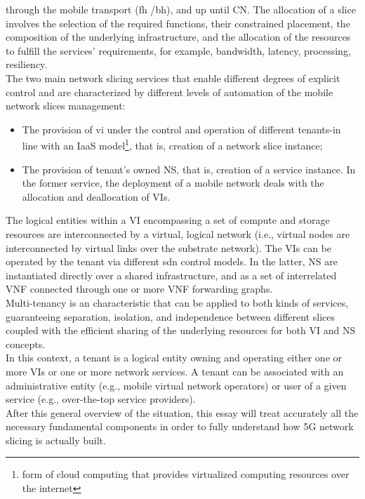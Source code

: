 \documentclass{report}
\begin{document}
through the mobile transport (\gls{fh} /\gls{bh}), and up until
\gls{CN}. The allocation of a slice involves the selection of the
required functions, their constrained placement, the composition of the underlying infrastructure, and the allocation of the resources to fulfill the services' requirements, for example, bandwidth, latency, processing, resiliency.\\
The two main network slicing services that enable different degrees
of explicit control and are characterized by different levels of automation of the
mobile network slices management:
\begin{itemize}
\item The provision of \gls{vi} under the control and operation
of different tenants-in line with an \gls{IaaS} model\footnote{form of cloud computing that provides virtualized computing resources over the internet},
that is, creation of a network slice instance;
\end{itemize}
\begin{itemize}
\item The provision of tenant's owned \gls{NS}, that is, creation of a service instance.
In the former service, the deployment of a mobile network deals with the
allocation and deallocation of VIs.
\end{itemize}
The logical entities within a VI encompassing
a set of compute and storage resources are interconnected by a virtual, logical
network (i.e., virtual nodes are interconnected by virtual links over the substrate
network). The VIs can be operated by the tenant via different \gls{sdn} control
models. In the latter, NS are instantiated directly over a shared infrastructure,
and as a set of interrelated \gls{VNF} connected through
one or more VNF forwarding graphs.\\
Multi-tenancy is an characteristic that can be applied to both
kinds of services, guaranteeing separation, isolation, and independence between
different slices coupled with the efficient sharing of the underlying resources
for both VI and NS concepts.\\
In this context, a tenant is a logical entity owning and operating either one or more VIs or one or more network services. A tenant can be associated with an administrative entity (e.g., mobile virtual network operators) or
user of a given service (e.g., over-the-top service providers).\\
After this general overview of the situation, this essay will treat accurately all the necessary fundamental components in order to fully understand how 5G network slicing is actually built.
\end{document}
